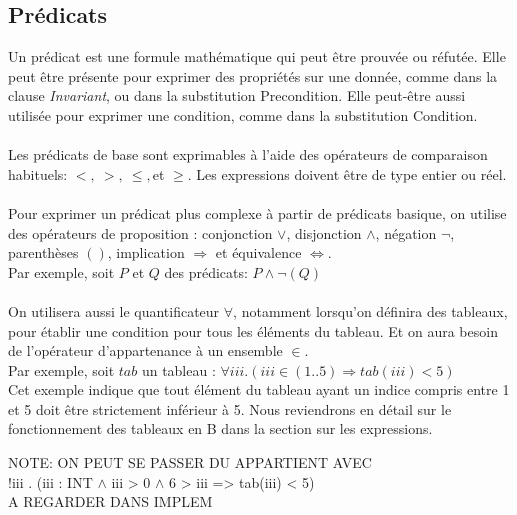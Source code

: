 \subsection{Prédicats}

Un prédicat est une formule mathématique qui peut être prouvée ou
réfutée. Elle peut être présente pour exprimer des propriétés sur une
donnée, comme dans la clause \emph{Invariant}, ou dans la substitution
Precondition. Elle peut-être aussi utilisée pour exprimer une
condition, comme dans la substitution Condition.

\paragraph{}
Les prédicats de base sont exprimables à l'aide des opérateurs de
comparaison habituels: $<,~>,~\leq,$et $\geq$. Les expressions doivent
être de type entier ou réel.

\paragraph{}
Pour exprimer un prédicat plus complexe à partir de prédicats basique,
on utilise des opérateurs de proposition : conjonction $\vee$,
disjonction $\wedge$, négation $\neg$, parenthèses $()$, implication
$\Rightarrow$ et équivalence $\Leftrightarrow$.\\
Par exemple, soit $P$ et $Q$ des prédicats: $P\wedge\neg(Q)$

\paragraph{}
On utilisera aussi le quantificateur $\forall$, notamment lorsqu'on
définira des tableaux, pour établir une condition pour tous les
éléments du tableau. Et on aura besoin de l'opérateur d'appartenance à
un ensemble $\in$.\\
Par exemple, soit $tab$ un tableau : $\forall iii . (iii \in (1..5)
\Rightarrow tab(iii) < 5)$\\
Cet exemple indique que tout élément du tableau ayant un indice compris
entre 1 et 5 doit être strictement inférieur à 5. Nous reviendrons en
détail sur le fonctionnement des tableaux en B dans la section sur les
expressions.

NOTE: ON PEUT SE PASSER DU APPARTIENT AVEC \\
!iii . (iii : INT $\wedge$ iii > 0 $\wedge$ 6 > iii => tab(iii) < 5) \\
A REGARDER DANS IMPLEM


